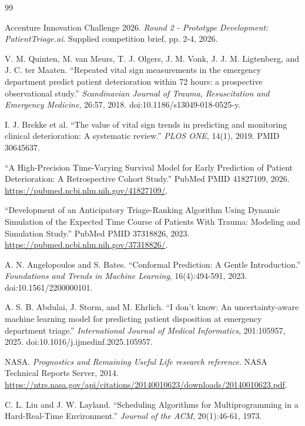 \documentclass[11pt,a4paper]{article}
\begin{document}
\clearpage
\small
\begin{thebibliography}{99}

Accenture Innovation Challenge 2026. \emph{Round 2 - Prototype Development: PatientTriage.ai}. Supplied competition brief, pp. 2-4, 2026.

V. M. Quinten, M. van Meurs, T. J. Olgers, J. M. Vonk, J. J. M. Ligtenberg, and J. C. ter Maaten. ``Repeated vital sign measurements in the emergency department predict patient deterioration within 72 hours: a prospective observational study.'' \emph{Scandinavian Journal of Trauma, Resuscitation and Emergency Medicine}, 26:57, 2018. doi:10.1186/s13049-018-0525-y.

I. J. Brekke et al. ``The value of vital sign trends in predicting and monitoring clinical deterioration: A systematic review.'' \emph{PLOS ONE}, 14(1), 2019. PMID 30645637.

``A High-Precision Time-Varying Survival Model for Early Prediction of Patient Deterioration: A Retrospective Cohort Study.'' PubMed PMID 41827109, 2026. \url{https://pubmed.ncbi.nlm.nih.gov/41827109/}.

``Development of an Anticipatory Triage-Ranking Algorithm Using Dynamic Simulation of the Expected Time Course of Patients With Trauma: Modeling and Simulation Study.'' PubMed PMID 37318826, 2023. \url{https://pubmed.ncbi.nlm.nih.gov/37318826/}.

A. N. Angelopoulos and S. Bates. ``Conformal Prediction: A Gentle Introduction.'' \emph{Foundations and Trends in Machine Learning}, 16(4):494-591, 2023. doi:10.1561/2200000101.

A. S. B. Abdulai, J. Storm, and M. Ehrlich. ``I don't know: An uncertainty-aware machine learning model for predicting patient disposition at emergency department triage.'' \emph{International Journal of Medical Informatics}, 201:105957, 2025. doi:10.1016/j.ijmedinf.2025.105957.

NASA. \emph{Prognostics and Remaining Useful Life research reference}. NASA Technical Reports Server, 2014. \url{https://ntrs.nasa.gov/api/citations/20140010623/downloads/20140010623.pdf}.

C. L. Liu and J. W. Layland. ``Scheduling Algorithms for Multiprogramming in a Hard-Real-Time Environment.'' \emph{Journal of the ACM}, 20(1):46-61, 1973.


\end{thebibliography}
\end{document}
